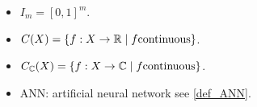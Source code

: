 



\begin{itemize}
\item $I_m = [0,1]^m$.
\item $C(X) = \{ f : X \to \mathbb{R} \mid f \text{continuous} \}$.
\item $C_\mathbb{C}(X) = \{ f : X \to \mathbb{C} \mid f \text{continuous} \}$.
\item ANN: artificial neural network see \cref{def_ANN}.
\end{itemize}
